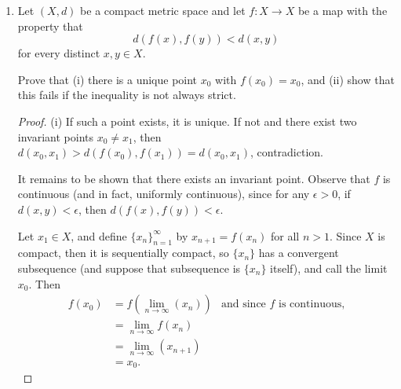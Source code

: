 \documentclass[12pt,letterpaper]{article}
\renewcommand{\dist}[2]{d\!\left(#1,#2\right)}
\begin{document}
\begin{enumerate}
\begin{enumerate}[label=(\roman*)]
\begin{proof}
%
Let $y\in \closure{f(A)}$. %
This means that for any open $V\ni y$, we have $V\cap f(A)\neq\emptyset$.

Now suppose for contradiction that $y\not\in f(\closure{A}).$ Since $f(\closure{A})$ is closed, then $f(\closure{A})^\complement$ is open, and $y\in f(\closure{A})^\complement$. So there exists an open set $V'$ such that $y\in V'\subset f(\closure{A})^\complement$ and furthermore that $V'\subset f(A)^\complement$. But since $y\in \closure{f(A)}$, then $V'\cap f(A)\neq\emptyset$, contradiction. 
\end{proof}
\end{enumerate}

\item Let $(X,d)$ be a compact metric space and let $f:X\to X$ be a map with the property that 
$$\dist{f(x)}{f(y)}<\dist{x}{y}$$
for every distinct $x,y\in X$. 

Prove that (i) there is a unique point $x_0$ with $f(x_0)=x_0$, and (ii) show that this fails if the inequality is not always strict. 
	\begin{proof}
	(i) If such a point exists, it is unique. If not and there exist two invariant points $x_0\neq x_1$, then $\dist{x_0}{x_1}>\dist{f(x_0)}{f(x_1)}=\dist{x_0}{x_1}$, contradiction. 
	
	It remains to be shown that there exists an invariant point. 
	Observe that $f$ is continuous (and in fact, uniformly continuous), since for any $\epsilon>0$, if $\dist{x}{y}<\epsilon$, then $\dist{f(x)}{f(y)}<\epsilon$. %
	
	Let $x_1\in X$, and define $\{x_n\}_{n=1}^\infty$ by $x_{n+1}=f(x_n)$ for all $n>1$. Since $X$ is compact, then it is sequentially compact, so $\{x_n\}$ has a convergent subsequence (and \Wlog{} suppose that subsequence is $\{x_n\}$ itself), and call the limit $x_0$. Then 
	\begin{align*}
	f(x_0)&=f\left(\lim_{n\to\infty}(x_n)\right) & \text{and since $f$ is continuous,}\\
	&=\lim_{n\to\infty}f\left(x_n\right)\\
	&=\lim_{n\to\infty}(x_{n+1})\\
	&=x_0.
	\end{align*}
		

\end{proof}
\end{enumerate}
\end{document}
